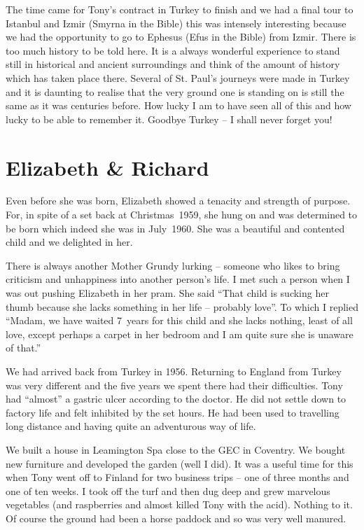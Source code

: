 The time came for Tony's contract in Turkey to finish and we had a
final tour to Istanbul and Izmir (Smyrna in the Bible) this was
intensely interesting because we had the opportunity to go to Ephesus
(Efus in the Bible) from Izmir. There is too much history to be told
here. It is a always wonderful experience to stand still in historical
and ancient surroundings and think of the amount of history which has
taken place there. Several of St. Paul’s journeys were made in Turkey
and it is daunting to realise that the very ground one is standing on
is still the same as it was centuries before. How lucky I am to have
seen all of this and how lucky to be able to remember it. Goodbye
Turkey -- I shall never forget you!


\chapter{Elizabeth \& Richard}

Even before she was born, Elizabeth showed a tenacity and strength of
purpose. For, in spite of a set back at Christmas~1959, she hung on
and was determined to be born which indeed she was in July~1960. She
was a beautiful and contented child and we delighted in her.

There is always another Mother Grundy lurking -- someone who likes to
bring criticism and unhappiness into another person's life. I met such
a person when I was out pushing Elizabeth in her pram. She said ``That
child is sucking her thumb because she lacks something in her life --
probably love''. To which I replied ``Madam, we have waited 7~years
for this child and she lacks nothing, least of all love, except
perhaps a carpet in her bedroom and I am quite sure she is unaware of
that.''


We had arrived back from Turkey in 1956. Returning to England from
Turkey was very different and the five years we spent there had their
difficulties. Tony had ``almost'' a gastric ulcer according to the
doctor. He did not settle down to factory life and felt inhibited by
the set hours. He had been used to travelling long distance and having
quite an adventurous way of life.

We built a house in Leamington Spa close to the GEC in Coventry. We
bought new furniture and developed the garden (well I did). It was a
useful time for this when Tony went off to Finland for two business
trips -- one of three months and one of ten weeks. I took off the turf
and then dug deep and grew marvelous vegetables (and raspberries and
almost killed Tony with the acid). Nothing to it. Of course the ground
had been a horse paddock and so was very well manured.

